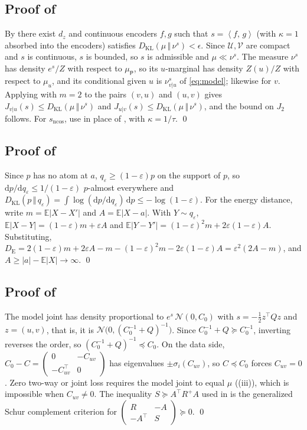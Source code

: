 \documentclass[11pt]{article}
\theoremstyle{plain}
\theoremstyle{definition}
\theoremstyle{remark}
\newcommand{\E}{\mathbb{E}}
\newcommand{\UU}{\mathcal{U}}
\newcommand{\VV}{\mathcal{V}}
\newcommand{\Dd}{\mathrm{d}}
\newcommand{\muP}{\mu_{\mathsf{P}}}
\newcommand{\KL}[2]{D_{\mathrm{KL}}\!\left(#1\,\Vert\,#2\right)}
\newcommand{\DE}{D_{\mathrm{E}}}
\newcommand{\IP}[2]{\left\langle #1,\, #2 \right\rangle}
\newcommand{\abs}[1]{\left\lvert #1 \right\rvert}
\newcommand{\sncos}{s_{\mathrm{ncos}}}
\newcommand{\Jvu}{J_{v\vert u}}
\newcommand{\Juv}{J_{u\vert v}}
\newcommand{\Jtwo}{J_{2}}
\begin{document}
\subsection{Proof of \texorpdfstring{}{Theorem 3.4}}
\label{app:approxagreement}
By \cite[Thm.~4.1]{stuart2026expressivity} there exist $d_z$ and continuous
encoders $f,g$ such that $s=\IP{f}{g}$ (with $\kappa=1$ absorbed into the
encoders) satisfies $\KL{\mu}{\nu^{s}}<\epsilon$. Since $\UU,\VV$ are compact
and $s$ is continuous, $s$ is bounded, so $s$ is admissible and $\mu\ll\nu^{s}$.
The measure $\nu^{s}$ has density $e^{s}/Z$ with respect to $\muP$, so its
$u$-marginal has density $Z(u)/Z$ with respect to $\mu_u$, and its
conditional given $u$ is $\nu^{s}_{v\vert u}$ of \eqref{eq:model}; likewise
for $v$. Applying \cite[Thm.~2.6]{stuart2026expressivity} with $m=2$ to the
pairs $(v,u)$ and $(u,v)$ gives $\Jvu(s)\le\KL{\mu}{\nu^{s}}$ and
$\Juv(s)\le\KL{\mu}{\nu^{s}}$, and the bound on $\Jtwo$ follows. For
$\sncos$, use \cite[Thm.~4.2]{stuart2026expressivity} in place of
\cite[Thm.~4.1]{stuart2026expressivity}, with $\kappa=1/\tau$.
\qed

\subsection{Proof of \texorpdfstring{}{Proposition 3.5}}
\label{app:klblind}
Since $p$ has no atom at $a$, $q_\varepsilon\ge(1-\varepsilon)p$ on the
support of $p$, so $\Dd p/\Dd q_\varepsilon\le1/(1-\varepsilon)$ $p$-almost
everywhere and $\KL{p}{q_\varepsilon}=\int\log(\Dd p/\Dd q_\varepsilon)\,\Dd p\le-\log(1-\varepsilon)$.
For the energy distance, write $m=\E\abs{X-X'}$ and $A=\E\abs{X-a}$. With
$Y\sim q_\varepsilon$, $\E\abs{X-Y}=(1-\varepsilon)m+\varepsilon A$ and
$\E\abs{Y-Y'}=(1-\varepsilon)^{2}m+2\varepsilon(1-\varepsilon)A$.
Substituting, $\DE=2(1-\varepsilon)m+2\varepsilon A-m-(1-\varepsilon)^{2}m-2\varepsilon(1-\varepsilon)A=\varepsilon^{2}(2A-m)$,
and $A\ge\abs{a}-\E\abs{X}\to\infty$.
\qed

\subsection{Proof of \texorpdfstring{}{Proposition 3.6}}
\label{app:l2rigid}
The model joint has density proportional to $e^{s}\,\mathcal{N}(0,C_0)$ with
$s=-\tfrac12z^{\top}Qz$ and $z=(u,v)$, that is, it is
$\mathcal{N}\bigl(0,(C_0^{-1}+Q)^{-1}\bigr)$. Since
$C_0^{-1}+Q\succeq C_0^{-1}$, inverting reverses the order, so
$(C_0^{-1}+Q)^{-1}\preceq C_0$. On the data side,
$C_0-C=\begin{pmatrix}0&-C_{uv}\\-C_{uv}^{\top}&0\end{pmatrix}$ has
eigenvalues $\pm\sigma_i(C_{uv})$, so $C\preceq C_0$ forces $C_{uv}=0$. Zero
two-way or joint loss requires the model joint to equal $\mu$
((iii)), which is impossible when $C_{uv}\neq0$. The
inequality $S\succeq A^{\top}R^{+}A$ used in  is the
generalized Schur complement criterion for
$\begin{pmatrix}R&-A\\-A^{\top}&S\end{pmatrix}\succeq0$.
\qed
\end{document}
